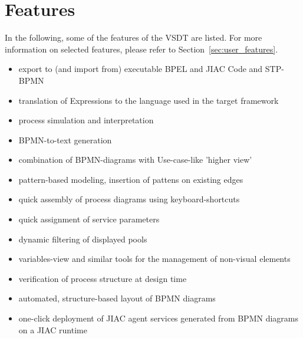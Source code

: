 \section{Features}


In the following, some of the features of the VSDT are listed.  For more information
on selected features, please refer to Section~\ref{sec:user_features}.

\begin{itemize}
	\item export to (and import from) executable BPEL and JIAC Code and STP-BPMN
	\item translation of Expressions to the language used in the target framework
	\item process simulation and interpretation
	\item BPMN-to-text generation
	\item combination of BPMN-diagrams with Use-case-like 'higher view'
	\item pattern-based modeling, insertion of pattens on existing edges
	\item quick assembly of process diagrams using keyboard-shortcuts
	\item quick assignment of service parameters
	\item dynamic filtering of displayed pools
	\item variables-view and similar tools for the management of non-visual elements
	\item verification of process structure at design time
	\item automated, structure-based layout of BPMN diagrams
	\item one-click deployment of JIAC agent services generated from BPMN diagrams on a JIAC runtime
\end{itemize}

